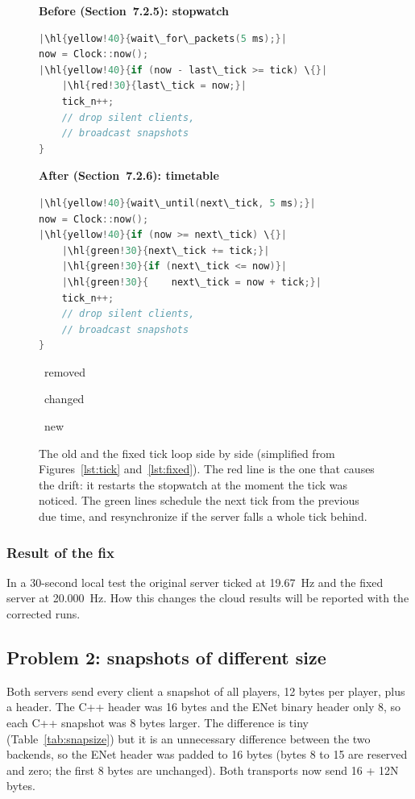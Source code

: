 \newcommand{\hl}[2]{\colorbox{#1}{\strut#2}}
\begin{figure}[H]
\centering
\begin{minipage}[t]{0.48\textwidth}
\textbf{\small Before (Section~7.2.5): stopwatch}\par\smallskip
\begin{lstlisting}[language=C++,basicstyle=\ttfamily\scriptsize,escapechar=|,frame=none]
|\hl{yellow!40}{wait\_for\_packets(5 ms);}|
now = Clock::now();
|\hl{yellow!40}{if (now - last\_tick >= tick) \{}|
    |\hl{red!30}{last\_tick = now;}|
    tick_n++;
    // drop silent clients,
    // broadcast snapshots
}
\end{lstlisting}
\end{minipage}\hfill
\begin{minipage}[t]{0.48\textwidth}
\textbf{\small After (Section~7.2.6): timetable}\par\smallskip
\begin{lstlisting}[language=C++,basicstyle=\ttfamily\scriptsize,escapechar=|,frame=none]
|\hl{yellow!40}{wait\_until(next\_tick, 5 ms);}|
now = Clock::now();
|\hl{yellow!40}{if (now >= next\_tick) \{}|
    |\hl{green!30}{next\_tick += tick;}|
    |\hl{green!30}{if (next\_tick <= now)}|
    |\hl{green!30}{    next\_tick = now + tick;}|
    tick_n++;
    // drop silent clients,
    // broadcast snapshots
}
\end{lstlisting}
\end{minipage}
\par\smallskip
{\small\colorbox{red!30}{\strut~removed~}\quad\colorbox{yellow!40}{\strut~changed~}\quad\colorbox{green!30}{\strut~new~}}
\caption{The old and the fixed tick loop side by side (simplified from Figures~\ref{lst:tick} and~\ref{lst:fixed}). The red line is the one that causes the drift: it restarts the stopwatch at the moment the tick was noticed. The green lines schedule the next tick from the previous due time, and resynchronize if the server falls a whole tick behind.}
\label{lst:diff}
\end{figure}

\subsubsection{Result of the fix}
In a 30-second local test the original server ticked at 19.67~Hz and the fixed server at 20.000~Hz. How this changes the cloud results will be reported with the corrected runs.

\subsection{Problem 2: snapshots of different size}
Both servers send every client a snapshot of all players, 12 bytes per player, plus a header. The C++ header was 16 bytes and the ENet binary header only 8, so each C++ snapshot was 8 bytes larger. The difference is tiny (Table~\ref{tab:snapsize}) but it is an unnecessary difference between the two backends, so the ENet header was padded to 16 bytes (bytes 8 to 15 are reserved and zero; the first 8 bytes are unchanged). Both transports now send 16 + 12N bytes.

